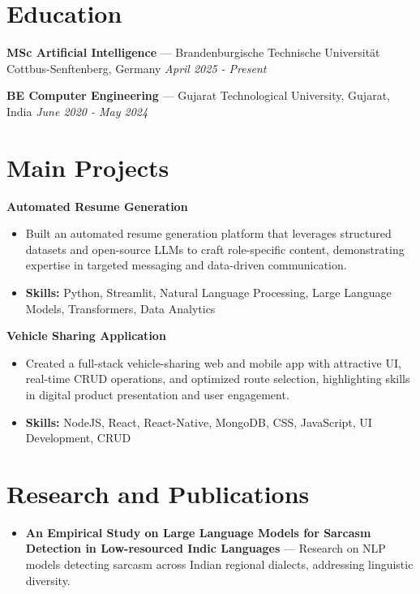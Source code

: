 \documentclass[a4paper,10pt]{article}
\begin{document}
\section*{Education}
\textbf{MSc Artificial Intelligence} — Brandenburgische Technische Universität Cottbus-Senftenberg, Germany \hfill \textit{April 2025 - Present}\par
\vspace{1.5pt}
\textbf{BE Computer Engineering} — Gujarat Technological University, Gujarat, India \hfill \textit{June 2020 - May 2024}\par

\section*{Main Projects}
\textbf{Automated Resume Generation}\par
\vspace{1pt}
\begin{itemize}
  \item Built an automated resume generation platform that leverages structured datasets and open-source LLMs to craft role-specific content, demonstrating expertise in targeted messaging and data-driven communication.
  \item \textbf{Skills:} Python, Streamlit, Natural Language Processing, Large Language Models, Transformers, Data Analytics
\end{itemize}
\vspace{3pt}
\textbf{Vehicle Sharing Application}\par
\vspace{1pt}
\begin{itemize}
  \item Created a full-stack vehicle-sharing web and mobile app with attractive UI, real-time CRUD operations, and optimized route selection, highlighting skills in digital product presentation and user engagement.
  \item \textbf{Skills:} NodeJS, React, React-Native, MongoDB, CSS, JavaScript, UI Development, CRUD
\end{itemize}

\section*{Research and Publications}
\begin{itemize}
\item \textbf{An Empirical Study on Large Language Models for Sarcasm Detection in Low-resourced Indic Languages} — Research on NLP models detecting sarcasm across Indian regional dialects, addressing linguistic diversity.
\end{itemize}
\end{document}
